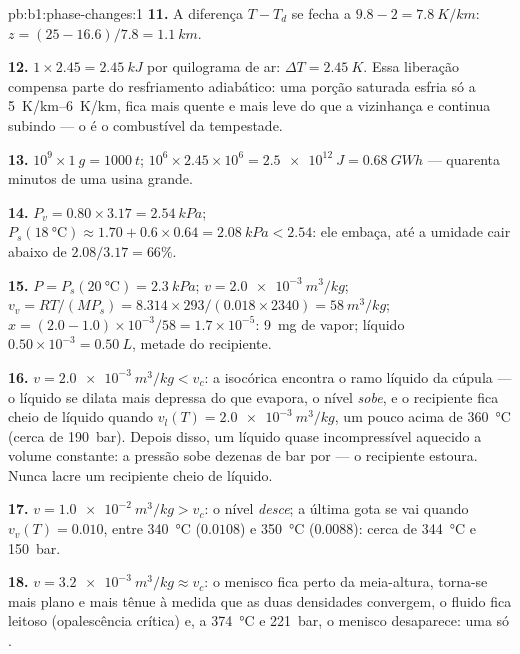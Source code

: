 \begin{solution}{pb:b1:phase-changes:1}
\textbf{11.} A diferença $T - T_d$ se fecha a $9.8 - 2 = \qty{7.8}{K/km}$: $z = (25 - 16.6)/
7.8 = \qty{1.1}{km}$.

\textbf{12.} $1 \times 2.45 = \qty{2.45}{kJ}$ por quilograma de ar: $\Delta T =
\qty{2.45}{K}$. Essa liberação compensa parte do resfriamento adiabático: uma
porção saturada esfria só a \qtyrange{5}{6}{K/km}, fica mais quente e mais
leve do que a vizinhança e continua subindo --- o  é
o combustível da tempestade.

\textbf{13.} $10^9 \times \qty{1}{g} = \qty{1000}{t}$; $10^6 \times 2.45 \times 10^6 =
\qty{2.5e12}{J} = \qty{0.68}{GW h}$ --- quarenta minutos de uma usina grande.

\textbf{14.} $P_v = 0.80 \times 3.17 = \qty{2.54}{kPa}$; $P_s(\qty{18}{\degreeCelsius})
\approx 1.70 + 0.6 \times 0.64 = \qty{2.08}{kPa} < 2.54$: ele embaça, até a
umidade cair abaixo de $2.08/3.17 = 66\%$.

\textbf{15.} $P = P_s(\qty{20}{\degreeCelsius}) = \qty{2.3}{kPa}$; $v = \qty{2.0e-3}{m^3/kg}$;
$v_v = RT/(MP_s) = 8.314 \times 293/(0.018 \times 2340) = \qty{58}{m^3/kg}$; $x =
(2.0 - 1.0) \times 10^{-3}/58 = 1.7 \times 10^{-5}$: \qty{9}{mg} de vapor;
líquido $0.50 \times 10^{-3} = \qty{0.50}{L}$, metade do recipiente.

\textbf{16.} $v = \qty{2.0e-3}{m^3/kg} < v_c$: a isocórica encontra o ramo
líquido da cúpula --- o líquido se dilata mais depressa do que evapora, o
nível \emph{sobe}, e o recipiente fica cheio de líquido quando $v_l(T) =
\qty{2.0e-3}{m^3/kg}$, um pouco acima de \qty{360}{\degreeCelsius} (cerca de
\qty{190}{bar}). Depois disso, um líquido quase incompressível aquecido a volume
constante: a pressão sobe dezenas de bar por  --- o recipiente
estoura. Nunca lacre um recipiente cheio de líquido.

\textbf{17.} $v = \qty{1.0e-2}{m^3/kg} > v_c$: o nível \emph{desce}; a última
gota se vai quando $v_v(T) = 0.010$, entre \qty{340}{\degreeCelsius} ($0.0108$)
e \qty{350}{\degreeCelsius} ($0.0088$): cerca de \qty{344}{\degreeCelsius} e
\qty{150}{bar}.

\textbf{18.} $v = \qty{3.2e-3}{m^3/kg} \approx v_c$: o menisco fica perto da
meia-altura, torna-se mais plano e mais tênue à medida que as duas densidades convergem,
o fluido fica leitoso (opalescência crítica) e, a \qty{374}{\degreeCelsius} e
\qty{221}{bar}, o menisco desaparece: uma só .


\end{solution}
